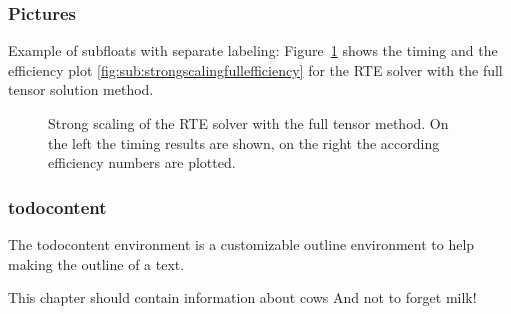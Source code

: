 \subsubsection{Pictures}
Example of subfloats with separate labeling:
Figure~\ref{fig:strongscalingfull} shows the timing  and the efficiency plot \ref{fig:sub:strongscalingfullefficiency} for the RTE solver with the full tensor solution method.
\begin{figure}[h]
    \centering
    \caption{Strong scaling of the RTE solver with the full tensor method. On the left the timing results are shown, on the right the according efficiency numbers are plotted.}
    \label{fig:strongscalingfull}
\end{figure}

\subsubsection{todocontent}
The todocontent environment is a customizable outline environment to help making the outline of a text.
\begin{todocontent}
    \1 This chapter should contain information about cows
    \1 And not to forget milk!
\end{todocontent}

